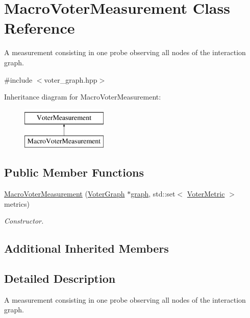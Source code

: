 \hypertarget{class_macro_voter_measurement}{\section{Macro\-Voter\-Measurement Class Reference}
\label{class_macro_voter_measurement}
}


A measurement consisting in one probe observing all nodes of the interaction graph.  




{\ttfamily \#include $<$voter\-\_\-graph.\-hpp$>$}

Inheritance diagram for Macro\-Voter\-Measurement\-:\begin{figure}[H]
\begin{center}
\leavevmode
\includegraphics[height=2.000000cm]{class_macro_voter_measurement}
\end{center}
\end{figure}
\subsection*{Public Member Functions}
\begin{DoxyCompactItemize}
\item 
\hyperlink{class_macro_voter_measurement_a5198644e81ae6561fd8d53e3a944328d}{Macro\-Voter\-Measurement} (\hyperlink{class_voter_graph}{Voter\-Graph} $\ast$\hyperlink{class_voter_measurement_a8d22d4b78f7e2f4c747f5716c4885351}{graph}, std\-::set$<$ \hyperlink{voter__graph_8hpp_acb4c45a5ce4a55eee28e54e60409b9c5}{Voter\-Metric} $>$ metrics)
\begin{DoxyCompactList}\small\item\em Constructor. \end{DoxyCompactList}\end{DoxyCompactItemize}
\subsection*{Additional Inherited Members}


\subsection{Detailed Description}
A measurement consisting in one probe observing all nodes of the interaction graph. 

